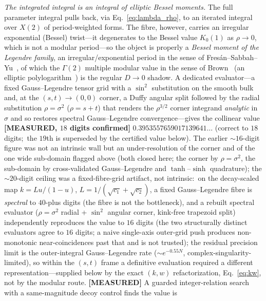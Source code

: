 \documentclass[aps,pra,twocolumn,superscriptaddress,longbibliography]{revtex4-2}
\newcommand{\gvq}[2]{#2}
\begin{document}
\emph{The integrated integral is an integral of elliptic Bessel moments.}  The full
parameter integral pulls back, via Eq.~\eqref{eq:lambda_rho}, to an iterated
integral over $X(2)$ of period-weighted forms.  The fibre, however, carries an
irregular exponential (Bessel) twist---it degenerates to the Bessel value
$K_{0}(1)$ as $\rho\to0$, which is not a modular period---so the object is
properly a \emph{Bessel moment of the Legendre family}, an irregular/exponential
period in the sense of Fres\'an--Sabbah--Yu~\cite{fresansabbahyu2023}, of which
the $\Gamma(2)$ multiple modular value in the sense of Brown~\cite{brown_mmv2014}
(an elliptic polylogarithm~\cite{brown_levin2011,beilinson_levin1994}) is the
regular $D\to0$ shadow.  A dedicated
evaluator---a fixed Gauss--Legendre tensor grid with a $\sin^{2}$ substitution on
the smooth bulk and, at the $(s,t)\to(0,0)$ corner, a Duffy angular split followed
by the radial substitution $\rho=\sigma^{2}$ ($\rho=s+t$) that renders the
$\rho^{3/2}$ corner integrand \emph{analytic} in $\sigma$ and so restores spectral
Gauss--Legendre convergence---gives the collinear value \textbf{[MEASURED,
$18$ digits confirmed]} $\gvq{t2_collinear_period}{0.3953557659017139641}\ldots$ (correct to $18$ digits;\ the
$19$th is superseded by the certified value below).  The earlier $\sim\!16$-digit
figure was not an intrinsic wall but an under-resolution of the corner and of the
one wide sub-domain flagged above (both closed here; the corner by $\rho=\sigma^{2}$,
the sub-domain by cross-validated Gauss--Legendre and $\tanh$--$\sinh$ quadrature);
the $\sim\!20$-digit ceiling was a fixed-fibre-grid artifact, not intrinsic:\ on the
decay-scaled map $k=Lu/(1-u)$, $L=1/(\sqrt{c_{1}}+\sqrt{c_{2}})$, a fixed Gauss--Legendre
fibre is \emph{spectral} to $40$-plus digits (the fibre is not the bottleneck), and a
rebuilt spectral evaluator ($\rho=\sigma^{2}$ radial + $\sin^{2}$ angular corner, kink-free
trapezoid split) independently reproduces the value to $16$ digits (the two structurally
distinct evaluators agree to $16$ digits; a naive single-axis outer-grid push produces
non-monotonic near-coincidences past that and is not trusted); the residual precision limit
is the outer-integral Gauss--Legendre rate ($\sim e^{-0.55N}$, complex-singularity-limited), so
within the $(s,t)$ frame a definitive evaluation required a different representation---supplied
below by the exact $(k,w)$ refactorization, Eq.~\eqref{eq:kw}, not by the modular route.  \textbf{[MEASURED]} A guarded
integer-relation search with a same-magnitude decoy control finds the value is
\end{document}
